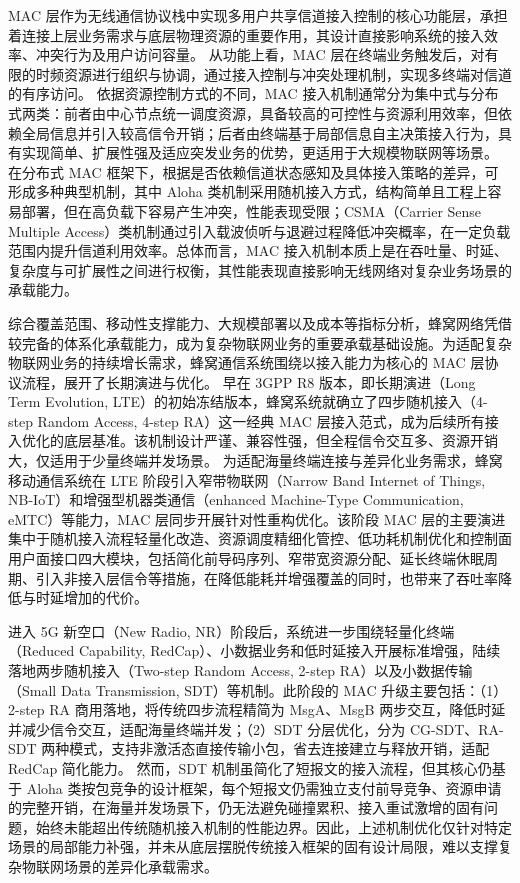 MAC 层\cite{2026_MACsurvey}作为无线通信协议栈中实现多用户共享信道接入控制的核心功能层，承担着连接上层业务需求与底层物理资源的重要作用，其设计直接影响系统的接入效率、冲突行为及用户访问容量。
从功能上看，MAC 层在终端业务触发后，对有限的时频资源进行组织与协调，通过接入控制与冲突处理机制，实现多终端对信道的有序访问。
依据资源控制方式的不同，MAC 接入机制通常分为集中式与分布式两类：前者由中心节点统一调度资源，具备较高的可控性与资源利用效率，但依赖全局信息并引入较高信令开销；后者由终端基于局部信息自主决策接入行为，具有实现简单、扩展性强及适应突发业务的优势，更适用于大规模物联网等场景。
在分布式 MAC 框架下，根据是否依赖信道状态感知及具体接入策略的差异，可形成多种典型机制\cite{2025_RAleo}，其中 Aloha 类机制采用随机接入方式，结构简单且工程上容易部署，但在高负载下容易产生冲突，性能表现受限；CSMA（Carrier Sense Multiple Access）类机制通过引入载波侦听与退避过程降低冲突概率，在一定负载范围内提升信道利用效率。总体而言，MAC 接入机制本质上是在吞吐量、时延、复杂度与可扩展性之间进行权衡，其性能表现直接影响无线网络对复杂业务场景的承载能力。

综合覆盖范围、移动性支撑能力、大规模部署以及成本等指标分析，蜂窝网络凭借较完备的体系化承载能力，成为复杂物联网业务的重要承载基础设施\cite{2018_5GIoTsurvey,2019_5GIoTsurvey}。为适配复杂物联网业务的持续增长需求，蜂窝通信系统围绕以接入能力为核心的 MAC 层协议流程，展开了长期演进与优化。
早在 3GPP R8 版本\cite{2013_4gLTERA}，即长期演进（Long Term Evolution, LTE）的初始冻结版本，蜂窝系统就确立了四步随机接入（4-step Random Access, 4-step RA）这一经典 MAC 层接入范式，成为后续所有接入优化的底层基准。该机制设计严谨、兼容性强，但全程信令交互多、资源开销大，仅适用于少量终端并发场景。
为适配海量终端连接与差异化业务需求，蜂窝移动通信系统在 LTE 阶段引入窄带物联网（Narrow Band Internet of Things, NB-IoT）和增强型机器类通信（enhanced Machine-Type Communication, eMTC）等能力，MAC 层同步开展针对性重构优化。该阶段 MAC 层的主要演进集中于随机接入流程轻量化改造、资源调度精细化管控、低功耗机制优化和控制面用户面接口四大模块，包括简化前导码序列、窄带宽资源分配、延长终端休眠周期、引入非接入层信令等措施，在降低能耗并增强覆盖的同时，也带来了吞吐率降低与时延增加的代价。

进入 5G 新空口（New Radio, NR）阶段后，系统进一步围绕轻量化终端（Reduced Capability, RedCap）、小数据业务和低时延接入开展标准增强，陆续落地两步随机接入（Two-step Random Access, 2-step RA）以及小数据传输（Small Data Transmission, SDT）等机制\cite{3GPP_TS36321,2020_2stepRA,3GPP_TS38321_R17}。此阶段的 MAC 升级主要包括：（1）2-step RA 商用落地，将传统四步流程精简为 MsgA、MsgB 两步交互，降低时延并减少信令交互，适配海量终端并发；（2）SDT 分层优化，分为 CG-SDT、RA-SDT 两种模式，支持非激活态直接传输小包，省去连接建立与释放开销，适配 RedCap 简化能力。
然而，SDT 机制虽简化了短报文的接入流程，但其核心仍基于 Aloha 类按包竞争的设计框架，每个短报文仍需独立支付前导竞争、资源申请的完整开销，在海量并发场景下，仍无法避免碰撞累积、接入重试激增的固有问题，始终未能超出传统随机接入机制的性能边界。因此，上述机制优化仅针对特定场景的局部能力补强，并未从底层摆脱传统接入框架的固有设计局限，难以支撑复杂物联网场景的差异化承载需求。



